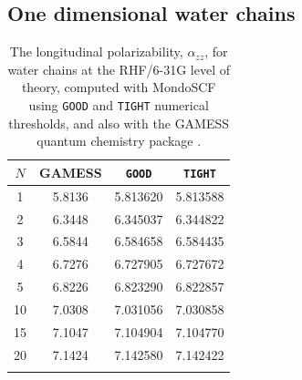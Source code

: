\documentclass[prl,aps,letterpaper,twocolumn,showpacs,twocolumngrid,superbib]{revtex4}
\begin{document}
\newpage

\subsection{One dimensional water chains}

\begin{table}[h]
  \centering
  \caption{\protect
    The longitudinal polarizability, $\alpha_{zz}$, for water chains at the RHF/6-31G level
    of theory, computed with {\sc MondoSCF} using {\tt GOOD} and {\tt TIGHT} numerical thresholds, 
   and also with the {\sc GAMESS} quantum chemistry package \cite{gamess}.
  }\label{tab:Alpha_1D_Values}
  \begin{tabular}{cccc}
    \toprule
    $N$ &\multicolumn{1}{c}{{\sc GAMESS}}
        &\multicolumn{1}{c}{{\tt GOOD}}
        &\multicolumn{1}{c}{{\tt TIGHT}}\\
    \hline
    1 & 5.8136 & 5.813620 & 5.813588 \\
    2 & 6.3448 & 6.345037 & 6.344822 \\
    3 & 6.5844 & 6.584658 & 6.584435 \\
    4 & 6.7276 & 6.727905 & 6.727672 \\
    5 & 6.8226 & 6.823290 & 6.822857 \\
   10 & 7.0308 & 7.031056 & 7.030858 \\
   15 & 7.1047 & 7.104904 & 7.104770 \\
   20 & 7.1424 & 7.142580 & 7.142422 \\
    \botrule
  \end{tabular}
\end{table}
\end{document}

